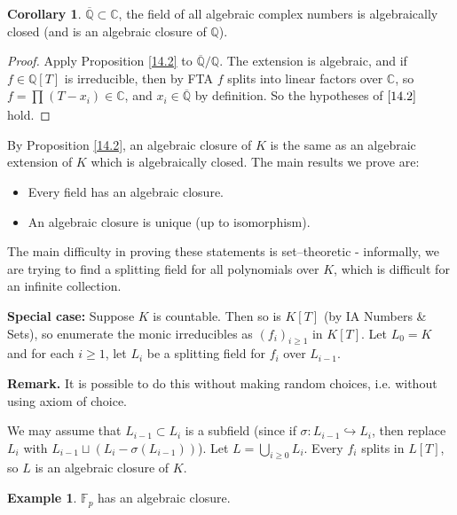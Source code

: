 \documentclass{article}
\theoremstyle{definition}
\newtheorem{cor}[theorem]{Corollary}
\newtheorem{example}{Example}[section]
\begin{document}
\begin{cor}
    $\overline{\mathbb{Q}} \subset \mathbb{C}$, the field of all algebraic complex numbers is algebraically closed (and is an algebraic closure of $\mathbb{Q}$).
\end{cor}
\begin{proof}
    Apply Proposition \ref{14.2} to $\overline{\mathbb{Q}}/\mathbb{Q}$. The extension is algebraic, and if $f \in \mathbb{Q}[T]$ is irreducible, then by FTA $f$ splits into linear factors over $\mathbb{C}$, so $f = \prod_{}^{} (T-x_i) \in \mathbb{C}$, and $x_i \in \overline{\mathbb{Q}}$ by definition. So the hypotheses of $\ref{14.2}$ hold.
\end{proof}
By Proposition \ref{14.2}, an algebraic closure of $K$ is the same as an algebraic extension of $K$ which is algebraically closed. The main results we prove are:
\begin{itemize}
    \item Every field has an algebraic closure.
    \item An algebraic closure is unique (up to isomorphism).
\end{itemize}
The main difficulty in proving these statements is set--theoretic - informally, we are trying to find a splitting field for all polynomials over $K$, which is difficult for an infinite collection.
\vspace{1mm}

\textbf{Special case:} Suppose $K$ is countable. Then so is $K[T]$ (by IA Numbers \& Sets), so enumerate the monic irreducibles as $(f_i)_{i\ge 1}$ in $K[T]$. Let $L_0 = K$ and for each $i\ge 1$, let $L_i$ be a splitting field for $f_i$ over $L_{i-1}$.
\vspace{1mm}

\textbf{Remark.} It is possible to do this without making random choices, i.e. without using axiom of choice.
\vspace{1mm}

We may assume that $L_{i-1} \subset L_i$ is a subfield (since if $\sigma: L_{i-1}\hookrightarrow L_i$, then replace $L_i$ with $L_{i-1} \sqcup (L_i - \sigma(L_{i-1}))$). Let $L = \bigcup_{i \ge 0} L_i$. Every $f_i$ splits in $L[T]$, so $L$ is an algebraic closure of $K$. 

\begin{example}
    $\mathbb{F}_p$ has an algebraic closure.
\end{example}
\end{document}
